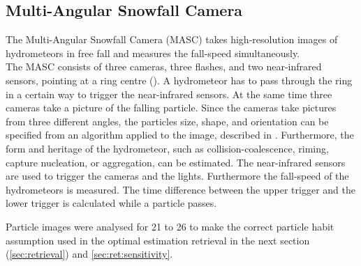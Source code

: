 \subsection{Multi-Angular Snowfall Camera}

The Multi-Angular Snowfall Camera (MASC) takes high-resolution images of hydrometeors in free fall and measures the fall-speed simultaneously. \\
The MASC consists of three cameras, three flashes, and two near-infrared sensors, pointing at a ring centre (). A hydrometeor has to pass through the ring in a certain way to trigger the near-infrared sensors. At the same time three cameras take a picture of the falling particle. Since the cameras take pictures from three different angles, the particles size, shape, and orientation can be specified from an algorithm applied to the image, described in \citet{garrett_fall_2012}. Furthermore, the form and heritage of the hydrometeor, such as collision-coalescence, riming, capture nucleation, or aggregation, can be estimated. The near-infrared sensors are used to trigger the cameras and the lights. Furthermore the fall-speed of the hydrometeors is measured. The time difference between the upper trigger and the lower trigger is calculated while a particle passes.
\par\medskip\noindent
Particle images were analysed for \num{21} to \SI{26}{\dec} to make the correct particle habit assumption used in the optimal estimation retrieval in the next section (\ref{sec:retrieval}) and \ref{sec:ret:sensitivity}.
